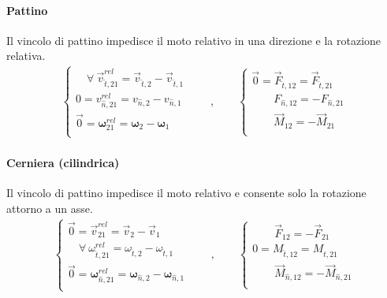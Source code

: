 \documentclass[letterpaper,10pt,italian]{jupyterBook}
\begin{document}
\paragraph{Pattino}
\label{\detokenize{ch/mechanics/actions-examples:pattino}}
\sphinxAtStartPar
Il vincolo di pattino impedisce il moto relativo in una direzione e la rotazione relativa.
\begin{equation*}
\begin{split}
\begin{cases}
  \quad \forall \ \vec{v}^{rel}_{\hat{t},21}     = \vec{v}_{\hat{t},2}     - \vec{v}_{\hat{t},1} \\
          0  = v^{rel}_{\hat{n},21}     = v_{\hat{n},2}     - v_{\hat{n},1} \\
  \vec{0} = \symbf{\omega}^{rel}_{21} = \symbf{\omega}_{2} - \symbf{\omega}_{1} \\
\end{cases}
\qquad , \qquad
\begin{cases}
  \vec{0} = \vec{F}_{\hat{t},12} = \vec{F}_{\hat{t},21} \\
  \qquad F_{\hat{n},12} = - F_{\hat{n},21} \\
  \qquad \vec{M}_{12} = - \vec{M}_{21} \\
\end{cases}
\end{split}
\end{equation*}

\paragraph{Cerniera (cilindrica)}
\label{\detokenize{ch/mechanics/actions-examples:cerniera-cilindrica}}
\sphinxAtStartPar
Il vincolo di pattino impedisce il moto relativo e consente solo la rotazione attorno a un asse.
\begin{equation*}
\begin{split}
\begin{cases}
  \vec{0} = \vec{v}^{rel}_{21}     = \vec{v}_{2}     - \vec{v}_{1} \\
  \quad \forall \ \omega^{rel}_{\hat{t},21} = \omega_{\hat{t},2} - \omega_{\hat{t},1} \\
  \vec{0} = \symbf{\omega}^{rel}_{\hat{n},21} = \symbf{\omega}_{\hat{n},2} - \symbf{\omega}_{\hat{n},1} \\
\end{cases}
\qquad , \qquad
\begin{cases}
  \qquad \vec{F}_{12} = - \vec{F}_{21} \\
  0 =  M_{\hat{t},12} = M_{\hat{t},21} \\
  \qquad \vec{M}_{\hat{n},12} = - \vec{M}_{\hat{n},21} \\
\end{cases}
\end{split}
\end{equation*}
\end{document}
